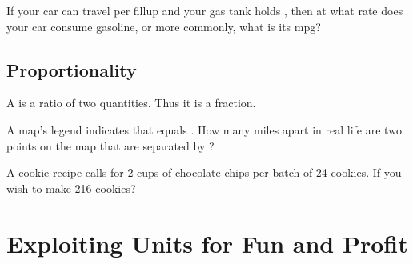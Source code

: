 \begin{exercise}
  If your car can travel  per fillup and your gas tank
  holds , then at what rate does your car consume
  gasoline, or more commonly, what is its mpg?

\end{exercise}

\subsection{Proportionality}
\label{sub:proportionality}

\begin{definition}
  A  is a ratio of two quantities. Thus it is a fraction.
\end{definition}

\begin{exercise}
  A map's legend indicates that  equals
  . How many miles apart in real life are two points on
  the map that are separated by ?

\end{exercise}

\begin{exercise}
  A cookie recipe calls for 2 cups of chocolate chips per batch of 24
  cookies. If you wish to make 216 cookies?

\end{exercise}

\newpage

\section{Exploiting Units for Fun and Profit}
\label{sec:exploiting-units}


